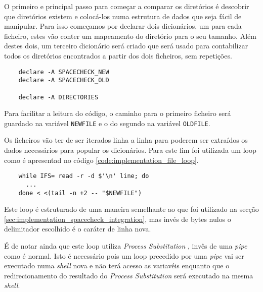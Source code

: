 O primeiro e principal passo para começar a comparar os diretórios é descobrir
que diretórios existem e colocá-los numa estrutura de dados que seja fácil de
manipular. Para isso começamos por declarar dois dicionários, um para cada
ficheiro, estes vão conter um mapeamento do diretório para o seu tamanho.
Além destes dois, um terceiro dicionário será criado que será usado para
contabilizar todos os diretórios encontrados a partir dos dois ficheiros,
sem repetições.

\begin{listing}[H]
	\centering
	\begin{verbatim}
    declare -A SPACECHECK_NEW
    declare -A SPACECHECK_OLD

    declare -A DIRECTORIES
  \end{verbatim}
	\cprotect\caption{Declaração dos dicionários usados no \Verb|spacerate.sh|}
\end{listing}

Para facilitar a leitura do código, o caminho para o primeiro ficheiro será
guardado na variável \Verb|NEWFILE| e o do segundo na variável
\Verb|OLDFILE|.

Os ficheiros vão ter de ser iterados linha a linha para poderem ser extraídos os
dados necessários para popular os dicionários. Para este fim foi utilizada um
loop  como é apresentad no código
\ref{code:implementation_file_loop}.

\begin{listing}[H]
	\centering
	\begin{verbatim}
    while IFS= read -r -d $'\n' line; do
      ...
    done < <(tail -n +2 -- "$NEWFILE")
  \end{verbatim}
	\cprotect\caption{Iteração sobre o ficheiro do \Verb|spacecheck.sh|}
	\label{code:implementation_file_loop}
\end{listing}

Este loop é estruturado de uma maneira semelhante ao que foi utilizado na secção
\ref{sec:implementation_spacecheck_integration}, mas invés de bytes nulos o
delimitador escolhido é o caráter de linha nova.

É de notar ainda que este loop utiliza \emph{Process Substitution}
\cite{bash_man}, invês de uma \emph{pipe} como é normal. Isto é necessário pois
um loop  precedido por uma \emph{pipe} vai ser executado numa
\emph{shell} nova e não terá acesso as variavéis enquanto que o redirecionamento
do resultado do \emph{Process Substitution} será executado na mesma
\emph{shell}.

